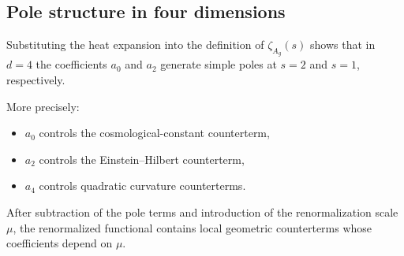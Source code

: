 \subsection{Pole structure in four dimensions}
  \label{subsec:pole-structure}

  Substituting the heat expansion into the definition of $\zeta_{A_g}(s)$
  shows that in $d=4$ the coefficients $a_0$ and $a_2$ generate simple poles
  at $s=2$ and $s=1$, respectively.

  More precisely:

  \begin{itemize}
    \item $a_0$ controls the cosmological-constant counterterm,
    \item $a_2$ controls the Einstein--Hilbert counterterm,
    \item $a_4$ controls quadratic curvature counterterms.
  \end{itemize}

  After subtraction of the pole terms and introduction of the renormalization
  scale $\mu$, the renormalized functional contains local geometric
  counterterms whose coefficients depend on $\mu$.
